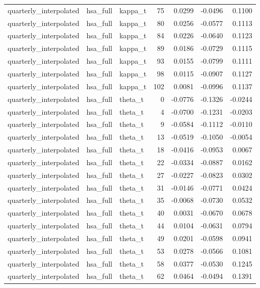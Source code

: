 \begin{tabular}{lllrrrr}
quarterly\_interpolated & hsa\_full & kappa\_t & 75 & 0.0299 & -0.0496 & 0.1100 \\
quarterly\_interpolated & hsa\_full & kappa\_t & 80 & 0.0256 & -0.0577 & 0.1113 \\
quarterly\_interpolated & hsa\_full & kappa\_t & 84 & 0.0226 & -0.0640 & 0.1123 \\
quarterly\_interpolated & hsa\_full & kappa\_t & 89 & 0.0186 & -0.0729 & 0.1115 \\
quarterly\_interpolated & hsa\_full & kappa\_t & 93 & 0.0155 & -0.0799 & 0.1111 \\
quarterly\_interpolated & hsa\_full & kappa\_t & 98 & 0.0115 & -0.0907 & 0.1127 \\
quarterly\_interpolated & hsa\_full & kappa\_t & 102 & 0.0081 & -0.0996 & 0.1137 \\
quarterly\_interpolated & hsa\_full & theta\_t & 0 & -0.0776 & -0.1326 & -0.0244 \\
quarterly\_interpolated & hsa\_full & theta\_t & 4 & -0.0700 & -0.1231 & -0.0203 \\
quarterly\_interpolated & hsa\_full & theta\_t & 9 & -0.0584 & -0.1112 & -0.0110 \\
quarterly\_interpolated & hsa\_full & theta\_t & 13 & -0.0519 & -0.1050 & -0.0054 \\
quarterly\_interpolated & hsa\_full & theta\_t & 18 & -0.0416 & -0.0953 & 0.0067 \\
quarterly\_interpolated & hsa\_full & theta\_t & 22 & -0.0334 & -0.0887 & 0.0162 \\
quarterly\_interpolated & hsa\_full & theta\_t & 27 & -0.0227 & -0.0823 & 0.0302 \\
quarterly\_interpolated & hsa\_full & theta\_t & 31 & -0.0146 & -0.0771 & 0.0424 \\
quarterly\_interpolated & hsa\_full & theta\_t & 35 & -0.0068 & -0.0730 & 0.0532 \\
quarterly\_interpolated & hsa\_full & theta\_t & 40 & 0.0031 & -0.0670 & 0.0678 \\
quarterly\_interpolated & hsa\_full & theta\_t & 44 & 0.0104 & -0.0631 & 0.0794 \\
quarterly\_interpolated & hsa\_full & theta\_t & 49 & 0.0201 & -0.0598 & 0.0941 \\
quarterly\_interpolated & hsa\_full & theta\_t & 53 & 0.0278 & -0.0566 & 0.1081 \\
quarterly\_interpolated & hsa\_full & theta\_t & 58 & 0.0377 & -0.0530 & 0.1245 \\
quarterly\_interpolated & hsa\_full & theta\_t & 62 & 0.0464 & -0.0494 & 0.1391 \\

\end{tabular}
